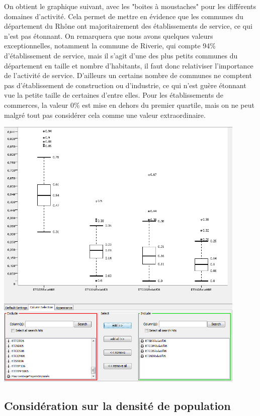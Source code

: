 On obtient le graphique suivant, avec les "boites à moustaches" pour les différents domaines d'activité. Cela permet de mettre en évidence que les communes du département du Rhône ont majoritairement des établissements de service, ce qui n'est pas étonnant. On remarquera que nous avons quelques valeurs exceptionnelles, notamment la commune de Riverie, qui compte 94\% d'établissement de service, mais il s'agit d'une des plus petits communes du département en taille et nombre d'habitants, il faut donc relativiser l'importance de l'activité de service.
D'ailleurs un certains nombre de communes ne comptent pas d'établissement de construction ou d'industrie, ce qui n'est guère étonnant vue la petite taille de certaines d'entre elles. Pour les établissements de commerces, la valeur 0\% est mise en dehors du premier quartile, mais on ne peut malgré tout pas considérer cela comme une valeur extraordinaire.

\begin{center}
	\includegraphics[width=0.9\textwidth]{png/BoxPlotDomainesActivité.png}
\end{center}

\subsection{Considération sur la densité de population}

